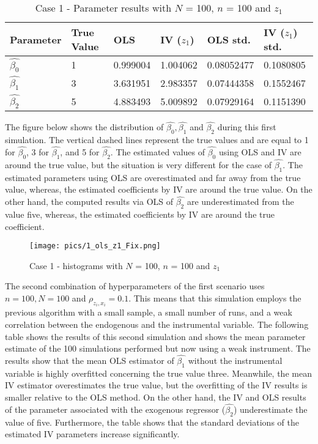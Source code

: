 \documentclass{article}
\begin{document}
\newline
\begin{table}[h!]
\centering
\begin{tabular}{ | m{2cm} | m{2cm}|  m{2cm}| m{2cm}|  m{2cm}| m{2cm}|} 
  \hline
  Parameter & True Value & OLS & IV ($z_{1}$) & OLS std. & IV ($z_{1}$) std.\\ 
  \hline
  $\hat{\beta_{0}}$ & 1 & 0.999004 & 1.004062 & 0.08052477 & 0.1080805\\ 
  \hline
  $\hat{\beta_{1}}$ & 3 & 3.631951 & 2.983357 & 0.07444358 & 0.1552467 \\
  \hline
  $\hat{\beta_{2}}$ & 5 & 4.883493 & 5.009892 & 0.07929164 & 0.1151390 \\
  \hline
\end{tabular}
\caption{Case 1 - Parameter results with $N$ = 100, $n$ = 100 and $z_{1}$}
\label{table:2}
\end{table}
\newline
The figure below shows the distribution of $\hat{\beta_{0}}, \hat{\beta_{1}}$ and $\hat{\beta_{2}}$ during this first simulation. The vertical dashed lines represent the true values and are equal to 1 for $\hat{\beta_{0}}$, 3 for $\hat{\beta_{1}}$, and 5 for $\hat{\beta_{2}}$. The estimated values of $\hat{\beta_{0}}$ using OLS and IV are around the true value, but the situation is very different for the case of $\hat{\beta_{1}}$. The estimated parameters using OLS are overestimated and far away from the true value, whereas, the estimated coefficients by IV are around the true value. On the other hand, the computed results via OLS of $\hat{\beta_{2}}$ are underestimated from the value five, whereas, the estimated coefficients by IV are around the true coefficient.
\begin{figure}[h]
\centering
\texttt{[image: pics/1\_ols\_z1\_Fix.png]}
\caption{Case 1 - histograms with $N$ = 100, $n$ = 100 and $z_{1}$}
\label{fig:image2}
\end{figure}
\newline
The second combination of hyperparameters of the first scenario uses $n = 100, N = 100$ and $\rho_{z_{i},x_{i}} = 0.1$. This means that this simulation employs the previous algorithm with a small sample, a small number of runs, and a weak correlation between the endogenous and the instrumental variable. 
\newline
The following table shows the results of this second simulation and shows the mean parameter estimate of the 100 simulations performed but now using a weak instrument. The results show that the mean OLS estimator of $\hat{\beta_{1}}$ without the instrumental variable is highly overfitted concerning the true value three. Meanwhile, the mean IV estimator overestimates the true value, but the overfitting of the IV results is smaller relative to the OLS method. On the other hand, the IV and OLS results of the parameter associated with the exogenous regressor ($\hat{\beta_{2}}$) underestimate the value of five. Furthermore, the table shows that the standard deviations of the estimated IV parameters increase significantly.
\end{document}
